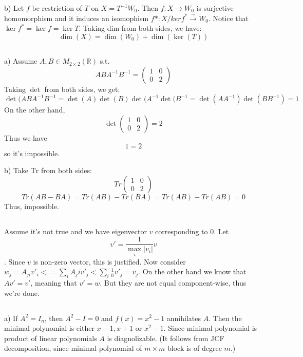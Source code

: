 \documentclass{amsart}
\def\R{\mathbb{R}}
\begin{document}
b) Let $f$ be restriction of $T$ on $X = T^{-1} W_0$. Then $f : X \to W_0$ is surjective homomorphism and it induces an isomophism $f*: X/ker f^* \overset{\sim}{\to} W_0$. Notice that $\ker f^* = \ker f = \ker T$. Taking dim from both sides, we have:
$$ \dim (X) = \dim (W_0) + \dim (\ker (T))$$

\subsection{
}
a)
Assume $A, B \in M_{2\times 2} (\R)$ s.t. 
$$ ABA^{-1} B^{-1} = \begin{pmatrix}
1 & 0 \\
0 & 2
\end{pmatrix}$$
Taking $\det$ from both sides, we get:
$$ \det(ABA^{-1}B^{-1} = \det(A) \det(B) \det(A^{-1} \det(B^{-1} = \det(A A^{-1}) \det(B B^{-1}) = 1$$
On the other hand,
$$ \det \begin{pmatrix}
1 & 0\\
0 & 2
\end{pmatrix} = 2$$
Thus we have $$1=2$$ so it's impossible.

b) Take $\text{Tr}$ from both sides:
$$
Tr \begin{pmatrix}
1 & 0\\
0 & 2
\end{pmatrix}
$$
$$ Tr(AB - BA) = Tr(AB) - Tr(BA) = Tr(AB) - Tr(AB) = 0$$
Thus, impossible. 

\subsection{}

\subsection{}
Assume it's not true and we have eigenvector $v$ corresponding to $0$. Let  $$v' = \frac{1}{\max_i |v_i|} v$$. Since $v$ is non-zero vector, this is justified.
Now consider $w_j = A_{ji} v'_i <= \sum_i A_ji v'_j < \sum_i \frac{1}{n} v'_j = v_j$.
On the other hand we know that $Av' = v'$, meaning that $v'= w$. But they are not equal component-wise, thus we're done.

\subsection{}

a) If $A^2 = I_n$, then $A^2 - I = 0$ and $f(x) = x^2-1$ annihilates $A$. Then the minimal polynomial is either $x-1, x+1$ or $x^2-1$. Since minimal polynomial is product of linear polynomials $A$ is diagnolizable. (It follows from JCF decomposition, since minimal polynomial of $m \times m$ block is of degree $m$.) 
\end{document}
